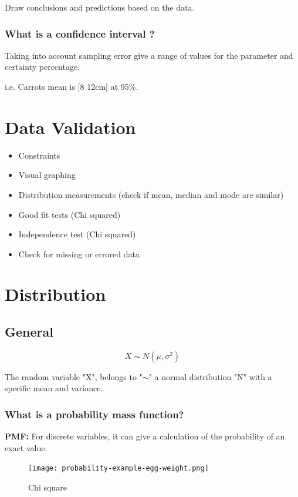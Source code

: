\documentclass[11pt]{scrartcl} %
\begin{document}
Draw conclusions and predictions based on the data.

\subsubsection{What is a confidence interval ?}

Taking into account sampling error give a range of values for the parameter and certainty percentage.

i.e. Carrots mean is [8 12cm] at 95\%.

\section{Data Validation}

\begin{itemize}
	\item Constraints
	\item Visual graphing
	\item Distribution measurements (check if mean, median and mode are similar)
	\item Good fit tests (Chi squared)
	\item Independence test (Chi squared)
	\item Check for missing or errored data
\end{itemize}

\section{Distribution}

\subsection{General}

\begin{equation}
	X \sim N(\mu,\sigma^2)
\end{equation}

The random variable "X", belongs to "\(\sim\)" a normal distribution "N" with a specific mean and variance.

\subsubsection{What is a probability mass function?}

\textbf{PMF:} For discrete variables, it can give a calculation of the probability of an exact value.

\begin{figure}[h] %
	\centering
	\texttt{[image: probability-example-egg-weight.png]} %
	\caption{Chi square}
\end{figure}
\end{document}
